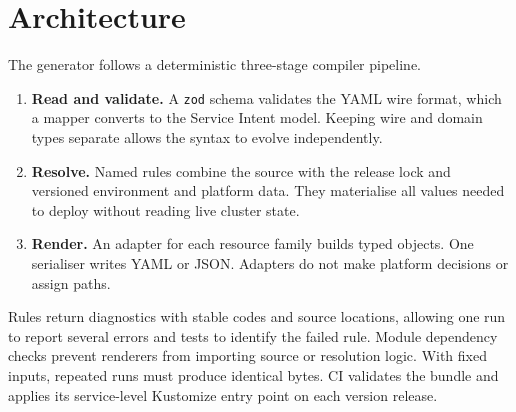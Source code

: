 \section{Architecture}

The generator follows a deterministic three-stage compiler pipeline.

\begin{enumerate}
  \item \textbf{Read and validate.} A \texttt{zod} schema validates the YAML
    wire format, which a mapper converts to the Service Intent model. Keeping
    wire and domain types separate allows the syntax to evolve independently.
  \item \textbf{Resolve.} Named rules combine the source with the release lock
    and versioned environment and platform data. They materialise all values
    needed to deploy without reading live cluster state.
  \item \textbf{Render.} An adapter for each resource family builds typed
    objects. One serialiser writes YAML or JSON. Adapters do not make platform
    decisions or assign paths.
\end{enumerate}

Rules return diagnostics with stable codes and source locations, allowing one
run to report several errors and tests to identify the failed rule. Module
dependency checks prevent renderers from importing source or resolution logic.
With fixed inputs, repeated runs must produce identical bytes. CI validates the
bundle and applies its service-level Kustomize entry point on each version
release.
